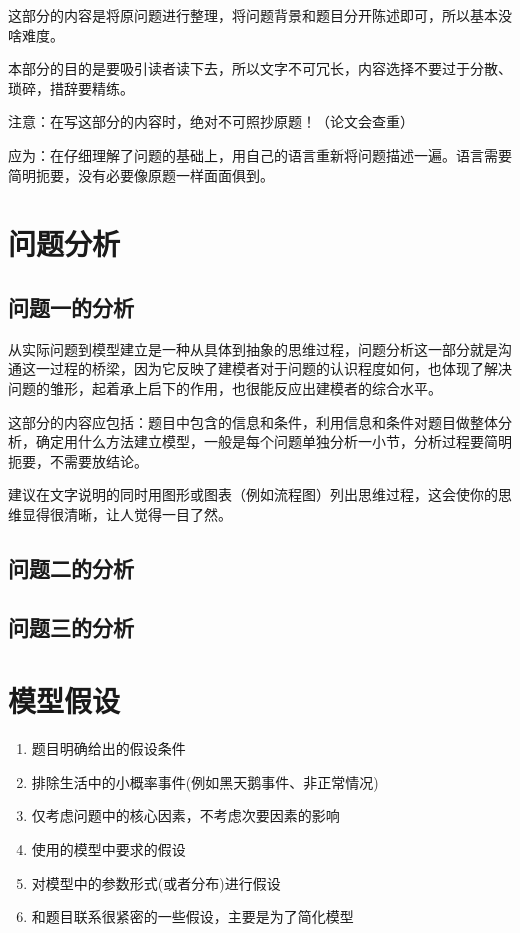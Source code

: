 \documentclass[withoutpreface,bwprint]{cumcmthesis} %
\begin{document}
这部分的内容是将原问题进行整理，将问题背景和题目分开陈述即可，所以基本没啥难度。

本部分的目的是要吸引读者读下去，所以文字不可冗长，内容选择不要过于分散、琐碎，措辞要精练。

注意：在写这部分的内容时，绝对不可照抄原题！（论文会查重）

应为：在仔细理解了问题的基础上，用自己的语言重新将问题描述一遍。语言需要简明扼要，没有必要像原题一样面面俱到。

\section{问题分析}

\subsection{问题一的分析}

从实际问题到模型建立是一种从具体到抽象的思维过程，问题分析这一部分就是沟通这一过程的桥梁，因为它反映了建模者对于问题的认识程度如何，也体现了解决问题的雏形，起着承上启下的作用，也很能反应出建模者的综合水平。

这部分的内容应包括：题目中包含的信息和条件，利用信息和条件对题目做整体分析，确定用什么方法建立模型，一般是每个问题单独分析一小节，分析过程要简明扼要，不需要放结论。

建议在文字说明的同时用图形或图表（例如流程图）列出思维过程，这会使你的思维显得很清晰，让人觉得一目了然。

\subsection{问题二的分析}

\subsection{问题三的分析}

\section{模型假设}

\begin{enumerate}
    \item 题目明确给出的假设条件
    \item 排除生活中的小概率事件(例如黑天鹅事件、非正常情况)
    \item 仅考虑问题中的核心因素，不考虑次要因素的影响
    \item 使用的模型中要求的假设
    \item 对模型中的参数形式(或者分布)进行假设
    \item 和题目联系很紧密的一些假设，主要是为了简化模型
\end{enumerate}
\end{document}
